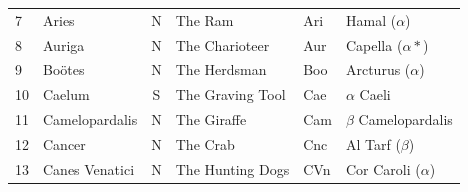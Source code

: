\documentclass[a4paper,12pt]{extarticle}
\begin{document}
\begin{table}[H]
\begin{tabular}{llclll}
7                                                                               & Aries                                         & N                                        & The Ram                                         & Ari                                                                              & Hamal ($\alpha$)                               \\
8                                                                               & Auriga                                        & N                                        & The Charioteer                                  & Aur                                                                              & Capella ($\alpha \ast$)                        \\
9                                                                               & Boötes                                        & N                                        & The Herdsman                                    & Boo                                                                              & Arcturus  ($\alpha$)                           \\
10                                                                              & Caelum                                        & S                                        & The Graving Tool                                & Cae                                                                              & $\alpha$ Caeli                                 \\
11                                                                              & Camelopardalis                                & N                                        & The Giraffe                                     & Cam                                                                              & $\beta$ Camelopardalis                         \\
12                                                                              & Cancer                                        & N                                        & The Crab                                        & Cnc                                                                              & Al Tarf  ($\beta$)                             \\
13                                                                              & Canes Venatici                                & N                                        & The Hunting Dogs                                & CVn                                                                              & Cor Caroli ($\alpha$)                          \\

\end{tabular}
\end{table}
\end{document}
